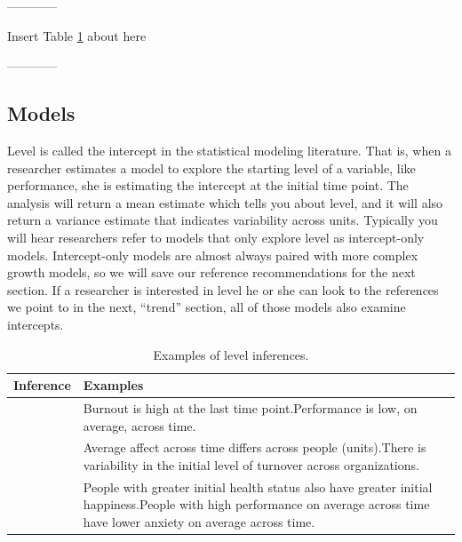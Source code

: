 \documentclass[english,,man]{apa6}
\theoremstyle{definition}
\theoremstyle{definition}
\theoremstyle{definition}
\theoremstyle{remark}
\begin{document}
\begin{center}

------------

Insert Table \ref{level_table} about here

------------

\end{center}

\hypertarget{models}{%
\subsection{Models}\label{models}}

Level is called the intercept in the statistical modeling literature.
That is, when a researcher estimates a model to explore the starting
level of a variable, like performance, she is estimating the intercept
at the initial time point. The analysis will return a mean estimate
which tells you about level, and it will also return a variance estimate
that indicates variability across units. Typically you will hear
researchers refer to models that only explore level as intercept-only
models. Intercept-only models are almost always paired with more complex
growth models, so we will save our reference recommendations for the
next section. If a researcher is interested in level he or she can look
to the references we point to in the next, \enquote{trend} section, all
of those models also examine intercepts.

\begin{table}

\caption{\label{tab:unnamed-chunk-7}\label{level_table}Examples of level inferences.}
\centering
\begin{tabular}[t]{>{\raggedright\arraybackslash}p{5em}>{\raggedright\arraybackslash}p{30em}}
\toprule
Inference & Examples\\
\midrule
1 & Burnout is high at the last time point.\newline Performance is low, on average, across time.\\
\hline
2 & Average affect across time differs across people (units).\newline There is variability in the initial level of turnover across organizations.\\
\hline
3 & People with greater initial health status also have greater initial happiness.\newline People with high performance on average across time have lower anxiety on average across time.\\
\bottomrule
\end{tabular}
\end{table}
\end{document}
